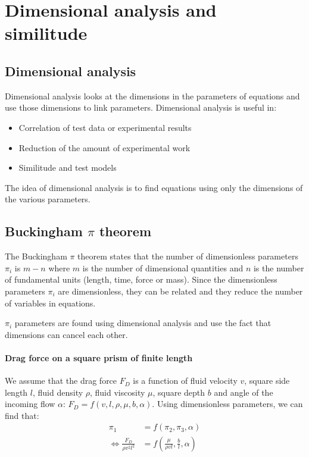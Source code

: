 \documentclass[10pt, twocolumn]{article}
\begin{document}
\section{Dimensional analysis and similitude}
\subsection{Dimensional analysis}
Dimensional analysis looks at the dimensions in the parameters of equations and use those dimensions to link parameters.
Dimensional analysis is useful in:
\begin{itemize}
  \item Correlation of test data or experimental results
  \item Reduction of the amount of experimental work
  \item Similitude and test models
\end{itemize}

The idea of dimensional analysis is to find equations using only the dimensions of the various parameters.


\subsection{Buckingham \(\pi\) theorem}
The Buckingham \(\pi\) theorem states that the number of dimensionless parameters \(\pi_i\) is \(m - n\) where \(m\) is the number of dimensional quantities and \(n\) is the number of fundamental units (length, time, force or mass).
Since the dimensionless parameters \(\pi_i\) are dimensionless, they can be related and they reduce the number of variables in equations.

\(\pi_i\) parameters are found using dimensional analysis and use the fact that dimensions can cancel each other.

\paragraph{Drag force on a square prism of finite length}
We assume that the drag force \(F_D\) is a function of fluid velocity \(v\), square side length \(l\), fluid density \(\rho\), fluid viscosity \(\mu\), square depth \(b\) and angle of the incoming flow \(\alpha\): \(F_D = f(v, l, \rho, \mu, b, \alpha)\).
Using dimensionless parameters, we can find that:
\[
  \begin{split}
    \pi_1 & = f(\pi_2, \pi_3, \alpha) \\
    \iff \frac{F_D}{\rho v^2 l^2} & = f\left( \frac{\mu}{\rho v l}, \frac{b}{l}, \alpha \right)
  \end{split}
\]
\end{document}
